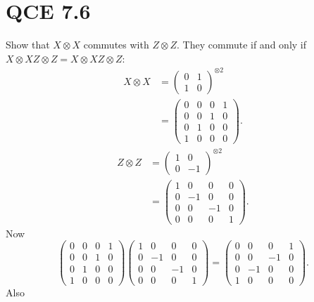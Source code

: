 \documentclass[10pt]{article}
\begin{document}
\section*{QCE 7.6}
Show that $X \otimes X$ commutes with $Z \otimes Z$. They commute if and only if $X \otimes X Z \otimes Z = X \otimes X Z \otimes Z$:
\begin{align*}
X \otimes X &= \begin{pmatrix}
0 & 1 \\
1 & 0
\end{pmatrix}^{\otimes 2} \\
&= \begin{pmatrix}
0 & 0 & 0 & 1 \\
0 & 0 & 1 & 0 \\
0 & 1 & 0 & 0 \\
1 & 0 & 0 & 0 
\end{pmatrix}.
\end{align*}
\begin{align*}
Z \otimes Z &= \begin{pmatrix}
1 & 0 \\
0 & -1
\end{pmatrix}^{\otimes 2} \\
&= 
\begin{pmatrix}
1 & 0   & 0  & 0 \\
0 & -1 & 0  & 0 \\
0 & 0   & -1 & 0 \\
0 & 0   & 0   & 1
\end{pmatrix}.
\end{align*}
Now
\[
\begin{pmatrix}
0 & 0 & 0 & 1 \\
0 & 0 & 1 & 0 \\
0 & 1 & 0 & 0 \\
1 & 0 & 0 & 0 
\end{pmatrix}
\begin{pmatrix}
1 & 0   & 0  & 0 \\
0 & -1 & 0  & 0 \\
0 & 0   & -1 & 0 \\
0 & 0   & 0   & 1
\end{pmatrix}
=
\begin{pmatrix}
0 & 0 & 0 & 1 \\
0 & 0 & -1 & 0 \\
0 & -1 & 0 & 0 \\
1 & 0 & 0 & 0 
\end{pmatrix}.
\]
Also 
\end{document}
